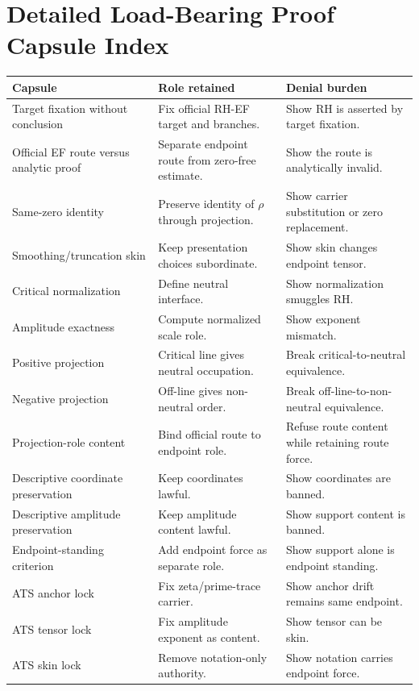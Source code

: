 \documentclass[11pt]{article}
\begin{document}
\section{Detailed Load-Bearing Proof Capsule Index}\label{app:detailed-capsules}

\begingroup\small
\begin{longtable}{L{0.25\textwidth}L{0.34\textwidth}L{0.31\textwidth}}
\toprule
\textbf{Capsule} & \textbf{Role retained} & \textbf{Denial burden}\\
\midrule
Target fixation without conclusion & Fix official RH-EF target and branches. & Show RH is asserted by target fixation.\\
Official EF route versus analytic proof & Separate endpoint route from zero-free estimate. & Show the route is analytically invalid.\\
Same-zero identity & Preserve identity of \(\rho\) through projection. & Show carrier substitution or zero replacement.\\
Smoothing/truncation skin & Keep presentation choices subordinate. & Show skin changes endpoint tensor.\\
Critical normalization & Define neutral interface. & Show normalization smuggles RH.\\
Amplitude exactness & Compute normalized scale role. & Show exponent mismatch.\\
Positive projection & Critical line gives neutral occupation. & Break critical-to-neutral equivalence.\\
Negative projection & Off-line gives non-neutral order. & Break off-line-to-non-neutral equivalence.\\
Projection-role content & Bind official route to endpoint role. & Refuse route content while retaining route force.\\
Descriptive coordinate preservation & Keep coordinates lawful. & Show coordinates are banned.\\
Descriptive amplitude preservation & Keep amplitude content lawful. & Show support content is banned.\\
Endpoint-standing criterion & Add endpoint force as separate role. & Show support alone is endpoint standing.\\
ATS anchor lock & Fix zeta/prime-trace carrier. & Show anchor drift remains same endpoint.\\
ATS tensor lock & Fix amplitude exponent as content. & Show tensor can be skin.\\
ATS skin lock & Remove notation-only authority. & Show notation carries endpoint force.\\

\end{longtable}
\end{document}
